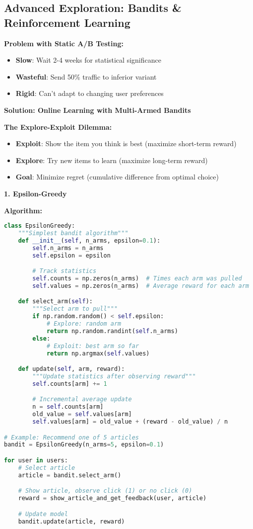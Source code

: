 \documentclass[10pt]{article}
\begin{document}
\subsection{Advanced Exploration: Bandits \& Reinforcement Learning}

\textbf{Problem with Static A/B Testing:}
\begin{itemize}
\item \textbf{Slow}: Wait 2-4 weeks for statistical significance
\item \textbf{Wasteful}: Send 50\% traffic to inferior variant
\item \textbf{Rigid}: Can't adapt to changing user preferences
\end{itemize}

\textbf{Solution: Online Learning with Multi-Armed Bandits}

\textbf{The Explore-Exploit Dilemma:}
\begin{itemize}
\item \textbf{Exploit}: Show the item you think is best (maximize short-term reward)
\item \textbf{Explore}: Try new items to learn (maximize long-term reward)
\item \textbf{Goal}: Minimize regret (cumulative difference from optimal choice)
\end{itemize}

\textbf{1. Epsilon-Greedy}

\textbf{Algorithm:}
\begin{lstlisting}[language=Python]
class EpsilonGreedy:
    """Simplest bandit algorithm"""
    def __init__(self, n_arms, epsilon=0.1):
        self.n_arms = n_arms
        self.epsilon = epsilon

        # Track statistics
        self.counts = np.zeros(n_arms)  # Times each arm was pulled
        self.values = np.zeros(n_arms)  # Average reward for each arm

    def select_arm(self):
        """Select arm to pull"""
        if np.random.random() < self.epsilon:
            # Explore: random arm
            return np.random.randint(self.n_arms)
        else:
            # Exploit: best arm so far
            return np.argmax(self.values)

    def update(self, arm, reward):
        """Update statistics after observing reward"""
        self.counts[arm] += 1

        # Incremental average update
        n = self.counts[arm]
        old_value = self.values[arm]
        self.values[arm] = old_value + (reward - old_value) / n

# Example: Recommend one of 5 articles
bandit = EpsilonGreedy(n_arms=5, epsilon=0.1)

for user in users:
    # Select article
    article = bandit.select_arm()

    # Show article, observe click (1) or no click (0)
    reward = show_article_and_get_feedback(user, article)

    # Update model
    bandit.update(article, reward)
\end{lstlisting}
\end{document}
